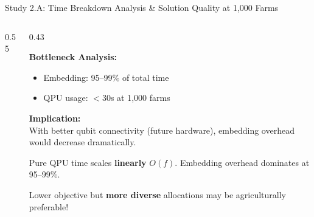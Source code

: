\documentclass[aspectratio=169,10pt]{beamer}
\begin{document}
\begin{frame}{Study 2.A: Time Breakdown Analysis \& Solution Quality at 1,000 Farms}
\begin{columns}[T]
\begin{column}{0.55\textwidth}
            

        \end{column}

        \begin{column}{0.43\textwidth}

            \small\textbf{Bottleneck Analysis:}

            \begin{itemize}
                \item Embedding: 95--99\% of total time
                \item QPU usage: $<$30s at 1,000 farms
            \end{itemize}


            \textbf{Implication:}\\
            With better qubit connectivity (future hardware), embedding overhead would decrease dramatically.


            \begin{keyinsight}
                \scriptsize Pure QPU time scales \textbf{linearly} $O(f)$. Embedding overhead dominates at 95--99\%.
            \end{keyinsight}


            \begin{resultbox}
                \scriptsize Lower objective but \textbf{more diverse} allocations may be agriculturally preferable!
            \end{resultbox}

        \end{column}

    \end{columns}

\end{frame}
\end{document}
